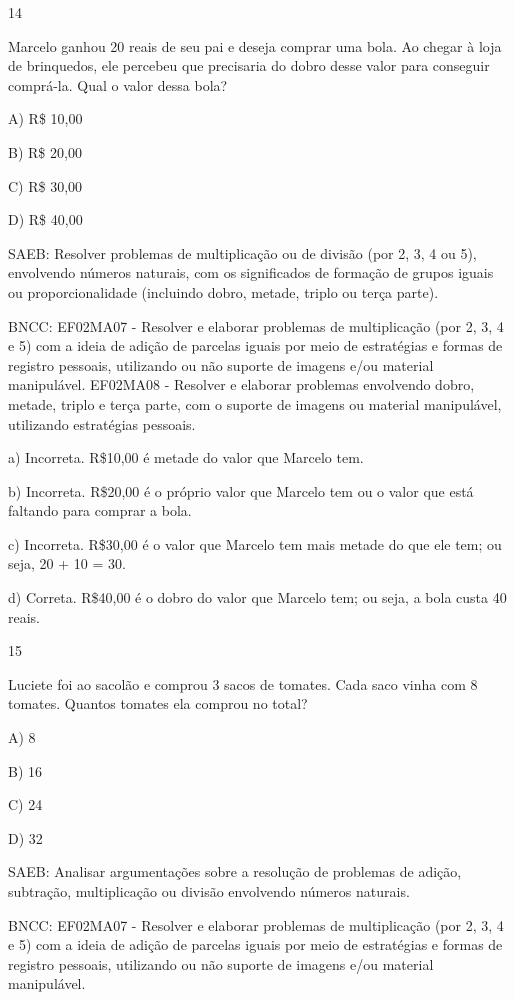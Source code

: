 \begin{escolha}
\begin{escolha}
{{{{{{{{\num{14}

Marcelo ganhou 20 reais de seu pai e deseja comprar uma bola. Ao chegar
à loja de brinquedos, ele percebeu que precisaria do dobro desse valor
para conseguir comprá-la. Qual o valor dessa bola?

A) R\$ 10,00

B) R\$ 20,00

C) R\$ 30,00

D) R\$ 40,00

SAEB: Resolver problemas de multiplicação ou de divisão (por 2,
3, 4 ou 5), envolvendo números naturais, com os significados de formação
de grupos iguais ou proporcionalidade (incluindo dobro, metade, triplo
ou terça parte).

BNCC: EF02MA07 - Resolver e elaborar problemas de multiplicação (por 2,
3, 4 e 5) com a ideia de adição de parcelas iguais por meio de
estratégias e formas de registro pessoais, utilizando ou não suporte de
imagens e/ou material manipulável. EF02MA08 - Resolver e elaborar
problemas envolvendo dobro, metade, triplo e terça parte, com o suporte
de imagens ou material manipulável, utilizando estratégias pessoais.

a) Incorreta. R\$10,00 é metade do valor que Marcelo tem.

b) Incorreta. R\$20,00 é o próprio valor que Marcelo tem ou o valor que
está faltando para comprar a bola.

c) Incorreta. R\$30,00 é o valor que Marcelo tem mais metade do que ele
tem; ou seja, 20 + 10 = 30.

d) Correta. R\$40,00 é o dobro do valor que Marcelo tem; ou seja, a bola
custa 40 reais.

\num{15}

Luciete foi ao sacolão e comprou 3 sacos de tomates. Cada saco vinha com
8 tomates. Quantos tomates ela comprou no total?

A) 8

B) 16

C) 24

D) 32

SAEB: Analisar argumentações sobre a resolução de problemas de
adição, subtração, multiplicação ou divisão envolvendo números naturais.

BNCC: EF02MA07 - Resolver e elaborar problemas de multiplicação (por 2,
3, 4 e 5) com a ideia de adição de parcelas iguais por meio de
estratégias e formas de registro pessoais, utilizando ou não suporte de
imagens e/ou material manipulável.

}}}}}}}}
\end{escolha}
\end{escolha}

